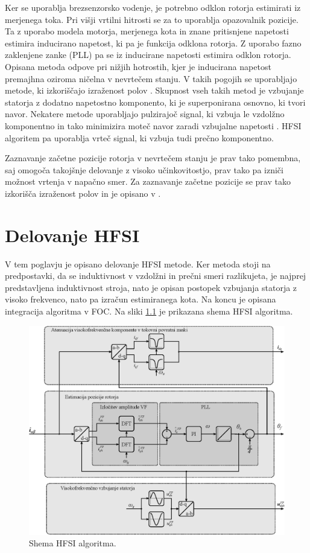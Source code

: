 \documentclass[a4paper,twoside,openright,12pt,slovene]{book}
\begin{document}
Ker se uporablja brezsenzorsko vodenje, je potrebno odklon rotorja estimirati iz merjenega toka. Pri višji vrtilni hitrosti se za to uporablja opazovalnik pozicije. Ta z uporabo modela motorja,
merjenega kota in znane pritisnjene napetosti estimira inducirano napetost, ki pa je funkcija odklona rotorja. Z uporabo fazno zaklenjene zanke (PLL) pa se iz inducirane napetosti estimira odklon
rotorja.
\\
Opisana metoda odpove pri nižjih hotrostih, kjer je inducirana napetost premajhna oziroma ničelna v nevrtečem stanju. V takih pogojih se uporabljajo metode, ki izkoriščajo izraženost polov
\cite{ThreeYearsOfExperience}. Skupnost vseh takih metod je vzbujanje statorja z dodatno napetostno komponento, ki je superponirana osnovno, ki tvori navor. Nekatere metode uporabljajo pulzirajoč
signal, ki vzbuja le vzdolžno komponentno in tako minimizira moteč navor zaradi vzbujalne napetosti \cite{955987}. HFSI algoritem pa uporablja vrteč signal, ki vzbuja tudi prečno komponentno.

Zaznavanje začetne pozicije rotorja v nevrtečem stanju je prav tako pomembna, saj omogoča takojšnje delovanje z visoko učinkovitostjo, prav tako pa izniči možnost vrtenja v napačno smer. Za zaznavanje
začetne pozicije se prav tako izkorišča izraženost polov in je opisano v \cite{IPDBoussak}.

\chapter{Delovanje HFSI} \label{teorija}

V tem poglavju je opisano delovanje HFSI metode. Ker metoda stoji na predpostavki, da se induktivnost v vzdolžni in prečni smeri razlikujeta, je najprej predstavljena induktivnost stroja, nato je
opisan postopek vzbujanja statorja z visoko frekvenco, nato pa izračun estimiranega kota. Na koncu je opisana integracija algoritma v FOC. Na sliki \ref{hfsiMetoda} je prikazana shema HFSI algoritma.

\begin{figure}[!htbp]
    \centering
    \includegraphics[width=0.9\columnwidth]{Slike/Inkscape/HFSI.eps}
    \caption{\label{hfsiMetoda} Shema HFSI algoritma.}
\end{figure}
\end{document}

